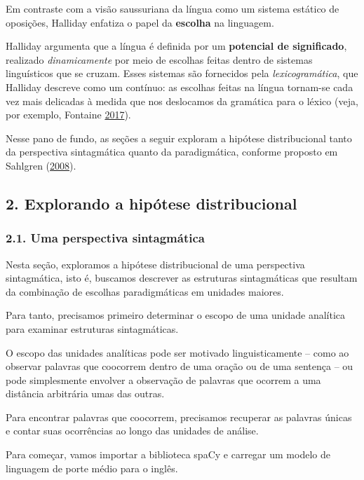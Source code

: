 \documentclass[
  brazilian,
]{article}
\begin{document}
Em contraste com a visão saussuriana da língua como um sistema estático
de oposições, Halliday enfatiza o papel da \textbf{escolha} na
linguagem.

Halliday argumenta que a língua é definida por um \textbf{potencial de
significado}, realizado \emph{dinamicamente} por meio de escolhas feitas
dentro de sistemas linguísticos que se cruzam. Esses sistemas são
fornecidos pela \emph{lexicogramática}, que Halliday descreve como um
contínuo: as escolhas feitas na língua tornam-se cada vez mais delicadas
à medida que nos deslocamos da gramática para o léxico (veja, por
exemplo, Fontaine
\href{https://doi.org/10.1186/s40554-017-0051-7}{2017}).

Nesse pano de fundo, as seções a seguir exploram a hipótese
distribucional tanto da perspectiva sintagmática quanto da
paradigmática, conforme proposto em Sahlgren
(\href{http://linguistica.sns.it/RdL/20.1/Sahlgren.pdf}{2008}).

\hypertarget{explorando-a-hipuxf3tese-distribucional}{%
\subsection{2. Explorando a hipótese
distribucional}\label{explorando-a-hipuxf3tese-distribucional}}

\hypertarget{uma-perspectiva-sintagmuxe1tica}{%
\subsubsection{2.1. Uma perspectiva
sintagmática}\label{uma-perspectiva-sintagmuxe1tica}}

Nesta seção, exploramos a hipótese distribucional de uma perspectiva
sintagmática, isto é, buscamos descrever as estruturas sintagmáticas que
resultam da combinação de escolhas paradigmáticas em unidades maiores.

Para tanto, precisamos primeiro determinar o escopo de uma unidade
analítica para examinar estruturas sintagmáticas.

O escopo das unidades analíticas pode ser motivado linguisticamente --
como ao observar palavras que coocorrem dentro de uma oração ou de uma
sentença -- ou pode simplesmente envolver a observação de palavras que
ocorrem a uma distância arbitrária umas das outras.

Para encontrar palavras que coocorrem, precisamos recuperar as palavras
únicas e contar suas ocorrências ao longo das unidades de análise.

Para começar, vamos importar a biblioteca spaCy e carregar um modelo de
linguagem de porte médio para o inglês.
\end{document}
